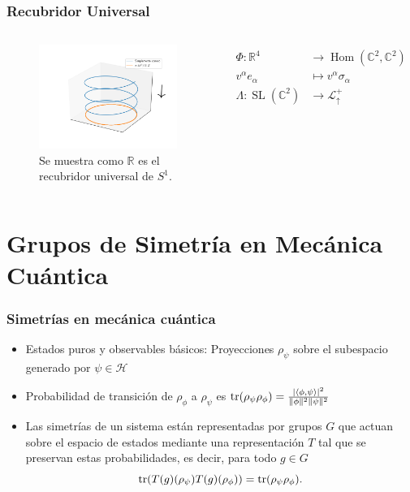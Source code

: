 \documentclass{beamer}
\DeclareMathOperator{\SL}{SL}
\DeclareMathOperator{\Hom}{Hom}
\begin{document}
\begin{frame}[fragile]
\frametitle{Recubridor Universal}
\begin{columns}
\begin{figure}
\centering
\includegraphics[width=\textwidth]{helice.png}
\caption{Se muestra como $\mathbb{R}$ es el recubridor universal de $S^1$.}
\end{figure}
\begin{align}
\begin{split}
\Phi:\mathbb{R}^4&\rightarrow \Hom(\mathbb{C}^2,\mathbb{C}^2)\\
v^\alpha e_\alpha&\mapsto v^\alpha\sigma_\alpha \\
\Lambda:\SL(\mathbb{C}^2)&\rightarrow \mathcal{L}^+_\uparrow
\end{split}
\end{align}
\end{columns}
\end{frame}

\section{Grupos de Simetría en Mecánica Cuántica}

\begin{frame}
\frametitle{Simetrías en mecánica cuántica}
\begin{itemize}
\item Estados puros y observables básicos: Proyecciones $\rho_\psi$ sobre el subespacio generado por $\psi\in\mathcal{H}$
\item Probabilidad de transición de $\rho_\phi$ a $\rho_\psi$ es $\tr(\rho_\psi\rho_\phi)=\frac{|\langle\phi,\psi\rangle|^2}{\|\phi\|^2\|\psi\|^2}$
\item Las simetrías de un sistema están representadas por grupos $G$ que actuan sobre el espacio de estados mediante una representación $T$ tal que se preservan estas probabilidades, es decir, para todo $g\in G$
\begin{equation}
\tr(T(g)(\rho_\psi)T(g)(\rho_\phi))=\tr(\rho_\psi\rho_\phi).
\end{equation} 
\end{itemize}
\end{frame}
\end{document}
